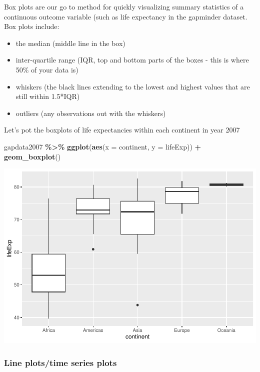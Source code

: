 \documentclass[
]{book}
\newenvironment{Shaded}{\begin{snugshade}}{\end{snugshade}}
\newcommand{\AttributeTok}[1]{\textcolor[rgb]{0.13,0.29,0.53}{#1}}
\newcommand{\FunctionTok}[1]{\textcolor[rgb]{0.13,0.29,0.53}{\textbf{#1}}}
\newcommand{\NormalTok}[1]{#1}
\newcommand{\SpecialCharTok}[1]{\textcolor[rgb]{0.81,0.36,0.00}{\textbf{#1}}}
\providecommand{\tightlist}{%
  \setlength{\itemsep}{0pt}\setlength{\parskip}{0pt}}
\begin{document}
Box plots are our go to method for quickly visualizing summary statistics of a continuous outcome variable (such as life expectancy in the gapminder dataset. Box plots include:

\begin{itemize}
\tightlist
\item
  the median (middle line in the box)
\item
  inter-quartile range (IQR, top and bottom parts of the boxes - this is where
  50\% of your data is)
\item
  whiskers (the black lines extending to the lowest and highest values that are
  still within 1.5*IQR)
\item
  outliers (any observations out with the whiskers)
\end{itemize}

Let's pot the boxplots of life expectancies within each continent in year 2007

\begin{Shaded}
\begin{Highlighting}[]
\NormalTok{gapdata2007 }\SpecialCharTok{\%\textgreater{}\%}
\FunctionTok{ggplot}\NormalTok{(}\FunctionTok{aes}\NormalTok{(}\AttributeTok{x =}\NormalTok{ continent, }\AttributeTok{y =}\NormalTok{ lifeExp)) }\SpecialCharTok{+}
\FunctionTok{geom\_boxplot}\NormalTok{()}
\end{Highlighting}
\end{Shaded}

\includegraphics{_main_files/figure-latex/unnamed-chunk-79-1.pdf}

\subsubsection{Line plots/time series plots}\label{line-plotstime-series-plots}
\end{document}

